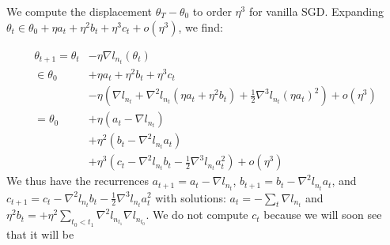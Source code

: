 \documentclass[openany, notitlepage, justified]{tufte-book}
\theoremstyle{plain}
\theoremstyle{definition}
\newcommand{\wrap}[1]{\left(#1\right)}
\begin{document}
            \begin{shaded}
                We compute the displacement $\theta_T-\theta_0$ to order $\eta^3$ 
                for vanilla SGD.  Expanding
                $
                    \theta_t \in \theta_0 + \eta a_t + \eta^2 b_t + \eta^3 c_t 
                    + o(\eta^3)
                $, we find:
            \end{shaded}
            \begin{shaded}
                \begin{align*}
                    \theta_{t+1}
                    =
                    \theta_t    &-  \eta \nabla l_{n_t} (\theta_t) \\
                    \in\theta_0 &+  \eta a_t + \eta^2 b_t + \eta^3 c_t \\
                                &-  \eta \wrap{
                                         \nabla l_{n_t}
                                        +\nabla^2 l_{n_t} (\eta a_t + \eta^2 b_t)
                                        +\frac{1}{2} \nabla^3 l_{n_t} (\eta a_t)^2
                                    }
                                 +  o(\eta^3) \\
                    =
                    \theta_0    &+   \eta   \wrap{a_t - \nabla l_{n_t}} \\
                                &+   \eta^2 \wrap{b_t - \nabla^2 l_{n_t} a_t} \\ 
                                &+   \eta^3 \wrap{
                                         c_t
                                        -\nabla^2 l_{n_t} b_t
                                        -\frac{1}{2} \nabla^3 l_{n_t} a_t^2
                                     }
                                 +   o(\eta^3)
                \end{align*}
                We thus have the recurrences
                $
                    a_{t+1} = a_t - \nabla l_{n_t}
                $,
                $
                    b_{t+1} = b_t - \nabla^2 l_{n_t} a_t
                $, and
                $
                    c_{t+1} = c_t -\nabla^2 l_{n_t} b_t 
                                  -\frac{1}{2} \nabla^3 l_{n_t} a_t^2
                $
                with solutions:
                $a_t = -\sum_{t} \nabla l_{n_t}$ and
                $\eta^2 b_t = +\eta^2 \sum_{t_0 < t_1} \nabla^2 l_{n_{t_1}} \nabla l_{n_{t_0}}$.
                We do not compute $c_t$ because we will soon see that it will be

\end{shaded}
\end{document}
